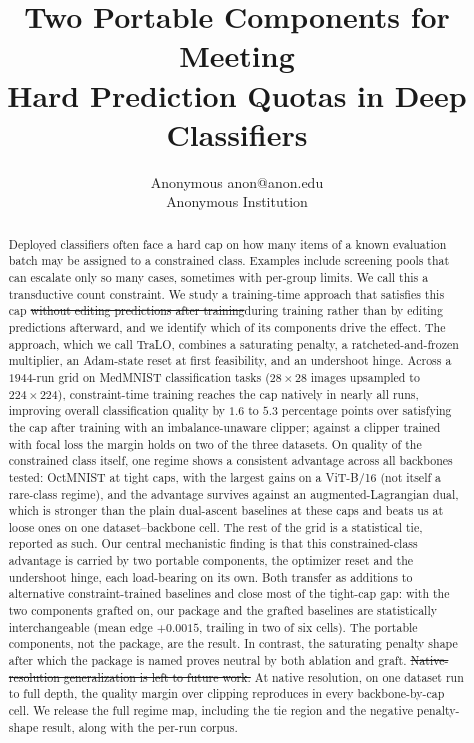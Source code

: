 \documentclass[10pt]{article}
\title{Two Portable Components for Meeting\\
Hard Prediction Quotas in Deep Classifiers}
\author{\name Anonymous \email anon@anon.edu \\
      \addr Anonymous Institution}
\newcommand{\del}[1]{{\color{red}\sout{#1}}}
\begin{document}
\maketitle

\begin{abstract}
Deployed classifiers often face a hard cap on how many items of a known
evaluation batch may be assigned to a constrained class. Examples include
screening pools that can escalate only so many cases, sometimes with
per-group limits. We call this a transductive count constraint. We study
a training-time approach that satisfies this cap \del{without editing
predictions after training}{\color{blue}during training rather than by editing
predictions afterward}, and we identify which of its components
drive the effect. The approach, which we call TraLO, combines a
saturating penalty, a ratcheted-and-frozen multiplier, an Adam-state
reset at first feasibility, and an undershoot hinge. Across a $1944$-run
grid on MedMNIST classification tasks ($28{\times}28$ images upsampled to
$224{\times}224$), constraint-time training reaches the cap natively in
nearly all runs, improving overall classification quality by $1.6$ to
$5.3$ percentage points over satisfying the cap after training
{\color{blue}with an imbalance-unaware clipper; against a clipper trained with
focal loss the margin holds on two of the three datasets}. On
quality of the constrained class itself, one regime shows a consistent
advantage across all backbones tested: OctMNIST at tight caps, with the
largest gains on a ViT{\color{blue}-B/16} (not itself a rare-class regime){\color{blue}, and the
advantage survives against an augmented-Lagrangian dual, which is stronger than
the plain dual-ascent baselines at these caps and beats us at loose ones on one
dataset--backbone cell}. The rest of
the grid is a statistical tie, reported as such. Our central
mechanistic finding is that this constrained-class advantage is carried
by two portable components, the optimizer reset and the undershoot
hinge{\color{blue}, each load-bearing on its own}. Both transfer as additions to
alternative constraint-trained
baselines and close most of the tight-cap gap{\color{blue}: with the two
components grafted on, our package and the grafted baselines are statistically
interchangeable (mean edge $+0.0015$, trailing in two of six cells). The portable
components, not the package, are the result}. In contrast, the
saturating penalty shape after which the package is named proves neutral
by both ablation and graft. \del{Native-resolution generalization is left to
future work.}
{\color{blue}At native resolution, on one dataset run to full depth, the
quality margin over clipping reproduces in every backbone-by-cap cell.}
We release the full regime map, including the tie region
and the negative penalty-shape result, along with the per-run corpus.
\end{abstract}
\end{document}
